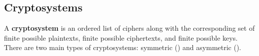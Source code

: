 \subsection{Cryptosystems}\label{sec:cryptography_basics:cryptosystems}

A \textbf{cryptosystem} is an ordered list of ciphers along with the corresponding set of finite possible plaintexts, finite possible ciphertexts, and finite possible keys. There are two main types of cryptosystems: symmetric () and asymmetric ().